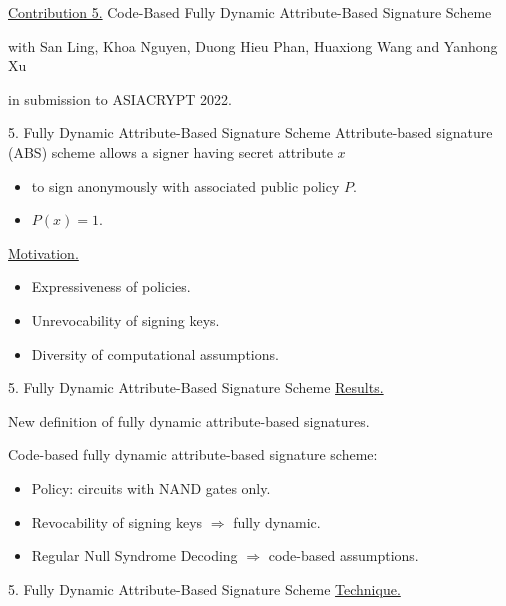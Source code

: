 \begin{frame}
	\underline{Contribution 5.} Code-Based Fully Dynamic Attribute-Based Signature Scheme
	
	{\small with San Ling, Khoa Nguyen, Duong Hieu Phan, Huaxiong Wang and Yanhong Xu}
	
	in submission to ASIACRYPT 2022.
\end{frame}

\begin{frame}{5. Fully Dynamic Attribute-Based Signature Scheme}
	Attribute-based signature (ABS) scheme allows a signer having secret attribute $x$
	\begin{itemize}
		\item to sign anonymously with associated public policy $P$.
		\item $P(x) = 1$.
	\end{itemize}
	
	\underline{Motivation.}
	\begin{itemize}
		\item Expressiveness of policies.
		\item Unrevocability of signing keys.
		\item Diversity of computational assumptions.
	\end{itemize}
\end{frame}

\begin{frame}{5. Fully Dynamic Attribute-Based Signature Scheme}
	\underline{Results.} 
	
	New definition of fully dynamic attribute-based signatures.
	
	Code-based fully dynamic attribute-based signature scheme:
	\begin{itemize}
		\item Policy: circuits with NAND gates only.
		\item Revocability of signing keys $\Rightarrow$ fully dynamic.
		\item Regular Null Syndrome Decoding $\Rightarrow$ code-based assumptions.
	\end{itemize}
\end{frame}

\begin{frame}{5. Fully Dynamic Attribute-Based Signature Scheme}
	\underline{Technique.}
	
\end{frame}